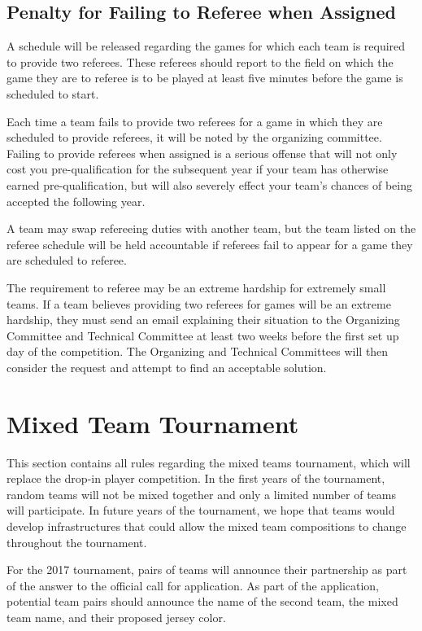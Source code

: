 \documentclass[12pt]{article}
\begin{document}
\subsection{Penalty for Failing to Referee when Assigned}
\label{sec:refPenalty}
A schedule will be released regarding the games for which each team is required to provide two referees.  These referees should report to the field on which the game they are to referee is to be played at least five minutes before the game is scheduled to start.

Each time a team fails to provide two referees for a game in which they are scheduled to provide referees, it will be noted by the organizing committee.  Failing to provide referees when assigned is a serious offense that will not only cost you pre-qualification for the subsequent year if your team has otherwise earned pre-qualification, but will also severely effect your team's chances of being accepted the following year.

A team may swap refereeing duties with another team, but the team listed on the referee schedule will be held accountable if referees fail to appear for a game they are scheduled to referee.

The requirement to referee may be an extreme hardship for extremely small teams.  If a team believes providing two referees for games will be an extreme hardship, they must send an email explaining their situation to the Organizing Committee and Technical Committee at least two weeks before the first set up day of the competition.  The Organizing and Technical Committees will then consider the request and attempt to find an acceptable solution.

\section{Mixed Team Tournament}
\label{sec:mixedTeamTournament}
This section contains all rules regarding the mixed teams tournament, which will replace the drop-in player competition. In the first years of the tournament, random teams will not be mixed together and only a limited number of teams will participate.  In future years of the tournament, we hope that teams would develop infrastructures that could allow the mixed team compositions to change throughout the tournament.

For the 2017 tournament, pairs of teams will announce their partnership as part of the answer to the official call for application. As part of the application, potential team pairs should announce the name of the second team, the mixed team name, and their proposed jersey color.
\end{document}
